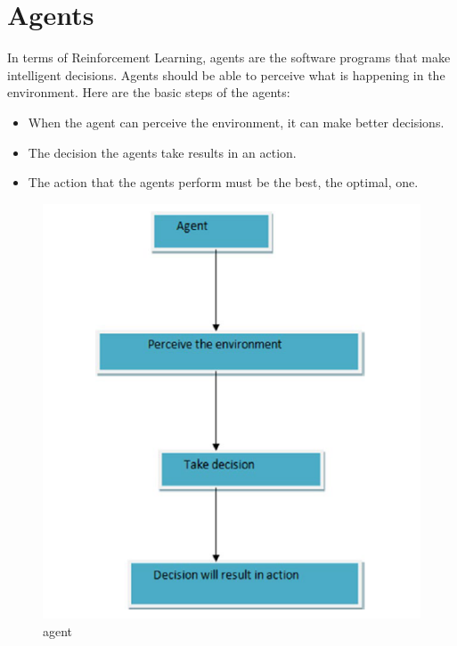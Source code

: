 \documentclass[12pt,a4paper]{article}
\begin{document}
\section{Agents}
In terms of Reinforcement Learning, agents are the software programs that make
intelligent decisions. Agents should be able to perceive what is happening in the
environment. Here are the basic steps of the agents:\\
\begin{itemize}
\item When the agent can perceive the environment, it can make
better decisions.
\end{itemize}
\begin{itemize}
\item The decision the agents take results in an action.
\end{itemize}
\begin{itemize}
\item The action that the agents perform must be the best, the
optimal, one.
\end{itemize}

\begin{figure}[hbt!]
\begin{center}
\includegraphics[scale=0.74]{agent}
\caption{agent}%
\end{center}
\end{figure}
\end{document}
